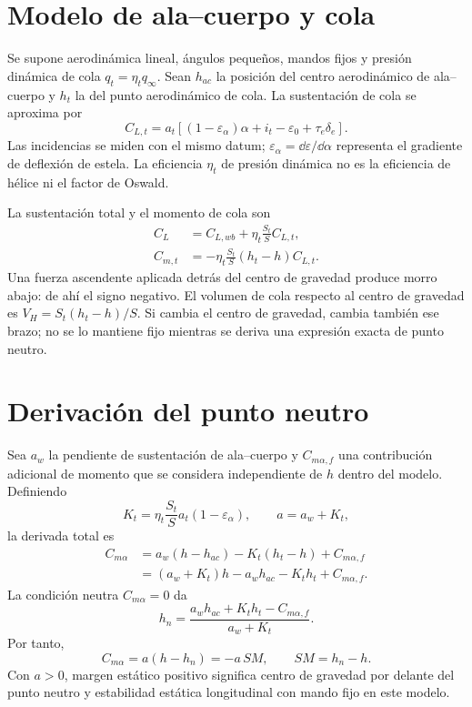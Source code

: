 \section{Modelo de ala--cuerpo y cola}
Se supone aerodinámica lineal, ángulos pequeños, mandos fijos y presión dinámica de cola $q_t=\eta_tq_\infty$. Sean $h_{ac}$ la posición del centro aerodinámico de ala--cuerpo y $h_t$ la del punto aerodinámico de cola. La sustentación de cola se aproxima por
\begin{equation}
C_{L,t}=a_t[(1-\varepsilon_\alpha)\alpha+i_t-\varepsilon_0+\tau_e\delta_e].
\end{equation}
Las incidencias se miden con el mismo datum; $\varepsilon_\alpha=\dd\varepsilon/\dd\alpha$ representa el gradiente de deflexión de estela. La eficiencia $\eta_t$ de presión dinámica no es la eficiencia de hélice ni el factor de Oswald.

La sustentación total y el momento de cola son
\begin{align}
C_L&=C_{L,wb}+\eta_t\frac{S_t}{S}C_{L,t},\\
C_{m,t}&=-\eta_t\frac{S_t}{S}(h_t-h)C_{L,t}.
\end{align}
Una fuerza ascendente aplicada detrás del centro de gravedad produce morro abajo: de ahí el signo negativo. El volumen de cola respecto al centro de gravedad es $V_H=S_t(h_t-h)/S$. Si cambia el centro de gravedad, cambia también ese brazo; no se lo mantiene fijo mientras se deriva una expresión exacta de punto neutro.

\section{Derivación del punto neutro}
Sea $a_w$ la pendiente de sustentación de ala--cuerpo y $C_{m\alpha,f}$ una contribución adicional de momento que se considera independiente de $h$ dentro del modelo. Definiendo
\begin{equation}
K_t=\eta_t\frac{S_t}{S}a_t(1-\varepsilon_\alpha),\qquad a=a_w+K_t,
\end{equation}
la derivada total es
\begin{align}
C_{m\alpha}&=a_w(h-h_{ac})-K_t(h_t-h)+C_{m\alpha,f}\\
&=(a_w+K_t)h-a_wh_{ac}-K_th_t+C_{m\alpha,f}.
\end{align}
La condición neutra $C_{m\alpha}=0$ da
\begin{equation}
h_n=\frac{a_wh_{ac}+K_th_t-C_{m\alpha,f}}{a_w+K_t}.
\label{eq:neutralpoint}
\end{equation}
Por tanto,
\begin{equation}
C_{m\alpha}=a(h-h_n)=-a\,SM,\qquad SM=h_n-h.
\label{eq:staticmargin}
\end{equation}
Con $a>0$, margen estático positivo significa centro de gravedad por delante del punto neutro y estabilidad estática longitudinal con mando fijo en este modelo.

